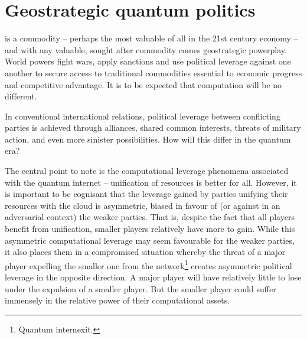 \section{Geostrategic quantum politics}

\newline

\newline

 is a commodity -- perhaps the most valuable of all in the 21st century economy -- and with any valuable, sought after commodity comes geostrategic powerplay. World powers fight wars, apply sanctions and use political leverage against one another to secure access to traditional commodities essential to economic progress and competitive advantage. It is to be expected that computation will be no different.

In conventional international relations, political leverage between conflicting parties is achieved through alliances, shared common interests, threats of military action, and even more sinister possibilities. How will this differ in the quantum era?

The central point to note is the computational leverage phenomena associated with the quantum internet -- unification of resources is better for all. However, it is important to be cognisant that the leverage gained by parties unifying their resources with the cloud is asymmetric, biased in favour of (or against in an adversarial context) the weaker parties. That is, despite the fact that all players benefit from unification, smaller players relatively have more to gain. While this asymmetric computational leverage may seem favourable for the weaker parties, it also places them in a compromised situation whereby the threat of a major player expelling the smaller one from the network\footnote{Quantum internexit.} creates asymmetric political leverage in the opposite direction. A major player will have relatively little to lose under the expulsion of a smaller player. But the smaller player could suffer immensely in the relative power of their computational assets.

